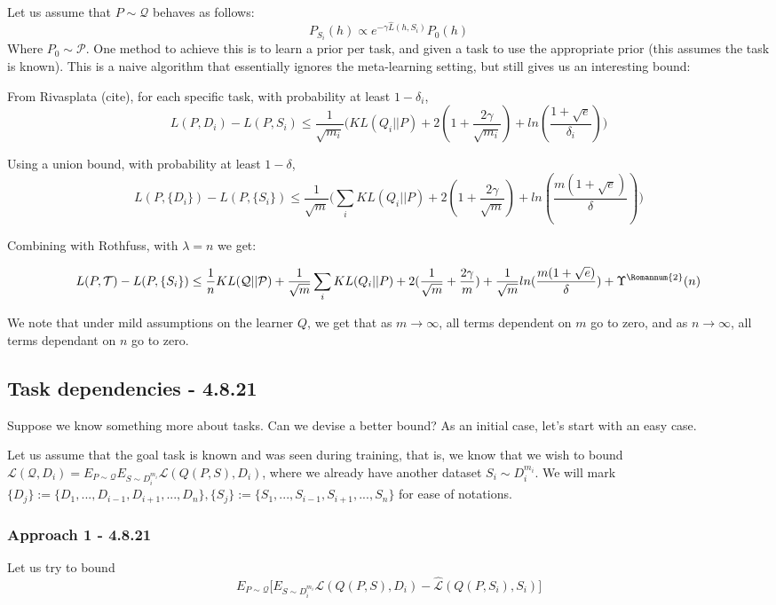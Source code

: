 \documentclass[letterpaper]{article}
\theoremstyle{definition}
\begin{document}
Let us assume that $P\sim \mathcal{Q}$ behaves as follows:
$$P_{S_i}(h)\propto e^{-\gamma \hat{L}(h,S_i)}P_0(h)$$
Where $P_0\sim \mathcal{P}$. One method to achieve this is to learn a prior per task, and given a task to use the appropriate prior (this assumes the task is known). This is a naive algorithm that essentially ignores the meta-learning setting, but still gives us an interesting bound:

From Rivasplata (cite), for each specific task, with probability at least $1-\delta_i$,
$$L(P,D_i)-L(P,S_i)\leq \frac{1}{\sqrt{m_i}}\bigl ( KL(Q_i||P) + 2(1+\frac{2\gamma}{\sqrt{m_i}})+ln(\frac{1+\sqrt{e}}{\delta_i}) \bigr )$$

Using a union bound, with probability at least $1-\delta$,
$$L(P,\{D_i\})-L(P,\{S_i\})\leq \frac{1}{\sqrt{m}}\bigl ( \sum_i KL(Q_i||P) + 2(1+\frac{2\gamma}{\sqrt{m}})+ln(\frac{m(1+\sqrt{e})}{\delta}) \bigr )$$

Combining with Rothfuss, with $\lambda=n$ we get:

$$L(P,\mathcal{T})-L(P,\{S_i\})\leq \frac{1}{n}KL(\mathcal{Q}||\mathcal{P}) + \frac{1}{\sqrt{m}}\sum_i KL(Q_i||P) + 2(\frac{1}{\sqrt{m}}+\frac{2\gamma}{m})+\frac{1}{\sqrt{m}}ln(\frac{m(1+\sqrt{e})}{\delta}) + \Upsilon^{\text{\Romannum{2}}}(n)$$
	
We note that under mild assumptions on the learner $Q$, we get that as $m\rightarrow\infty$, all terms dependent on $m$ go to zero, and as $n\rightarrow\infty$, all terms dependant on $n$ go to zero.

\subsection{Task dependencies - 4.8.21}

Suppose we know something more about tasks. Can we devise a better bound?
As an initial case, let's start with an easy case.

Let us assume that the goal task is known and was seen during training, that is, we know that we wish to bound $\mathcal{L}(\mathcal{Q}, D_i)=E_{P\sim \mathcal{Q}}E_{S\sim D_i^{m_i}}\mathcal{L}(Q(P, S), D_i)$, where we already have another dataset $S_i\sim D_i^{m_i}$. We will mark $\{D_j\}:=\{D_1,...,D_{i-1},D_{i+1},...,D_n\}, \{S_j\}:=\{S_1,...,S_{i-1},S_{i+1},...,S_n\}$ for ease of notations.

\subsubsection*{Approach 1 - 4.8.21}
Let us try to bound
$$E_{P\sim \mathcal{Q}}\bigl [E_{S\sim D_i^{m_i}}\mathcal{L}(Q(P, S), D_i)-\hat{\mathcal{L}}(Q(P, S_i), S_i)\bigr ]$$
\end{document}

